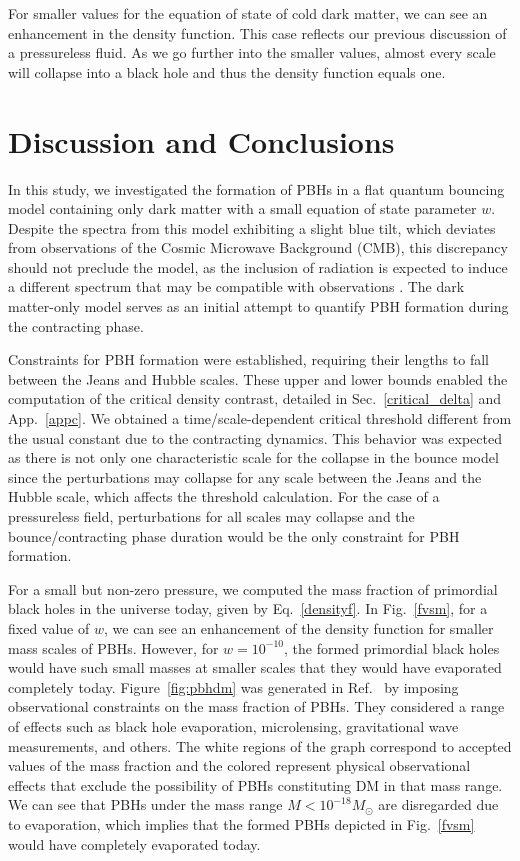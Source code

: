 \documentclass[a4paper,11pt]{article}
\begin{document}
For smaller values for the equation of state of cold dark matter, we can see an enhancement in the density function.  This case reflects our previous discussion of a pressureless fluid. As we go further into the smaller values, almost every scale will collapse into a black hole and thus the density function equals one.



\section{Discussion and Conclusions}
\label{sec:discussion}
In this study, we investigated the formation of PBHs in a flat quantum bouncing model containing only dark matter with a small equation of state parameter $w$. Despite the spectra from this model exhibiting a slight blue tilt, which deviates from observations of the Cosmic Microwave Background (CMB), this discrepancy should not preclude the model, as the inclusion of radiation is expected to induce a different spectrum that may be compatible with observations \cite{Vitenti2012}. The dark matter-only model serves as an initial attempt to quantify PBH formation during the contracting phase.

Constraints for PBH formation were established, requiring their lengths to fall between the Jeans and Hubble scales. These upper and lower bounds enabled the computation of the critical density contrast, detailed in Sec.~\ref{critical_delta} and App.~\ref{appc}. We obtained a time/scale-dependent critical threshold different from the usual constant due to the contracting dynamics. This behavior was expected as there is not only one characteristic scale for the collapse in the bounce model since the perturbations may collapse for any scale between the Jeans and the Hubble scale, which affects the threshold calculation. For the case of a pressureless field, perturbations for all scales may collapse and the bounce/contracting phase duration would be the only constraint for PBH formation. 

For a small but non-zero pressure, we computed the mass fraction of primordial black holes in the universe today, given by Eq.~\eqref{densityf}. In Fig.~\ref{fvsm}, for a fixed value of $w$, we can see an enhancement of the density function for smaller mass scales of PBHs. However, for $w = 10^{-10}$, the formed primordial black holes would have such small masses at smaller scales that they would have evaporated completely today. Figure~\ref{fig:pbhdm} was generated in Ref.~\cite{Villanueva2021} by imposing observational constraints on the mass fraction of PBHs. They considered a range of effects such as black hole evaporation, microlensing, gravitational wave measurements, and others. The white regions of the graph correspond to accepted values of the mass fraction and the colored represent physical observational effects that exclude the possibility of PBHs constituting DM in that mass range. We can see that PBHs under the mass range $M <  10^{-18}M_\odot$ are disregarded due to evaporation, which implies that the formed PBHs depicted in Fig.~\ref{fvsm} would have completely evaporated today.
\end{document}
